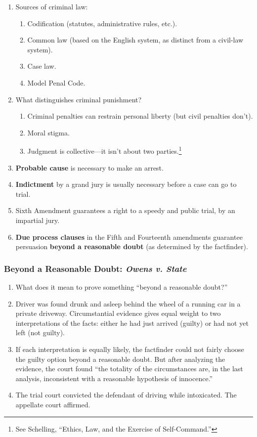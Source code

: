 \begin{enumerate}
    \item Sources of criminal law:
    \begin{enumerate}
        \item Codification (statutes, administrative rules, etc.).
        \item Common law (based on the English system, as distinct from a civil-law system).
        \item Case law.
        \item Model Penal Code.
    \end{enumerate}
    \item What distinguishes criminal punishment?
    \begin{enumerate}
        \item Criminal penalties can restrain personal liberty (but civil penalties don't).
        \item Moral stigma.
        \item Judgment is collective---it isn't about two parties.\footnote{See Schelling, ``Ethics, Law, and the Exercise of Self-Command.''}
    \end{enumerate}
    \item \textbf{Probable cause} is necessary to make an arrest.
    \item \textbf{Indictment} by a grand jury is usually necessary before a case can go to trial.
    \item Sixth Amendment guarantees a right to a speedy and public trial, by an impartial jury.
    \item \textbf{Due process clauses} in the Fifth and Fourteenth amendments guarantee persuasion \textbf{beyond a reasonable doubt} (as determined by the factfinder).
\end{enumerate}

\subsubsection{Beyond a Reasonable Doubt: \emph{Owens v. State}}
\begin{enumerate}
    \item What does it mean to prove something ``beyond a reasonable doubt?''
    \item Driver was found drunk and asleep behind the wheel of a running car in a private driveway. Circumstantial evidence gives equal weight to two interpretations of the facts: either he had just arrived (guilty) or had not yet left (not guilty).
    \item If each interpretation is equally likely, the factfinder could not fairly choose the guilty option beyond a reasonable doubt. But after analyzing the evidence, the court found ``the totality of the circumstances are, in the last analysis, inconsistent with a reasonable hypothesis of innocence.''
    \item The trial court convicted the defendant of driving while intoxicated. The appellate court affirmed.
\end{enumerate}

